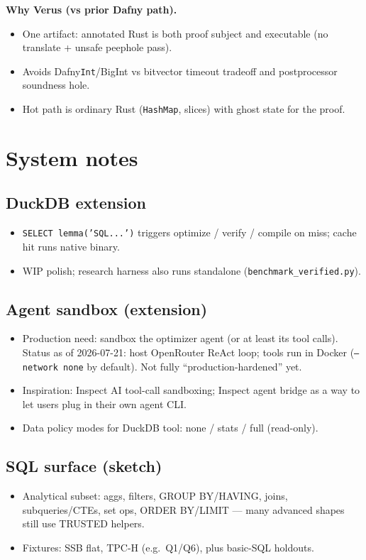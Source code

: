 \documentclass[sigconf, nonacm]{acmart}
\begin{document}
\noindent\textbf{Why Verus (vs prior Dafny path).}
\begin{itemize}
  \item One artifact: annotated Rust is both proof subject and executable (no translate + unsafe peephole pass).
  \item Avoids Dafny\texttt{Int}/BigInt vs bitvector timeout tradeoff and postprocessor soundness hole.
  \item Hot path is ordinary Rust (\texttt{HashMap}, slices) with ghost state for the proof.
\end{itemize}

\section{System notes}

\subsection{DuckDB extension}
\begin{itemize}
  \item \texttt{SELECT lemma('SQL...')} triggers optimize / verify / compile on miss; cache hit runs native binary.
  \item WIP polish; research harness also runs standalone (\texttt{benchmark\_verified.py}).
\end{itemize}

\subsection{Agent sandbox (extension)}
\begin{itemize}
  \item Production need: sandbox the optimizer agent (or at least its tool calls). Status as of 2026-07-21: host OpenRouter ReAct loop; tools run in Docker (\texttt{--network none} by default). Not fully ``production-hardened'' yet.
  \item Inspiration: Inspect AI tool-call sandboxing; Inspect agent bridge as a way to let users plug in their own agent CLI.
  \item Data policy modes for DuckDB tool: none / stats / full (read-only).
\end{itemize}

\subsection{SQL surface (sketch)}
\begin{itemize}
  \item Analytical subset: aggs, filters, GROUP BY/HAVING, joins, subqueries/CTEs, set ops, ORDER BY/LIMIT --- many advanced shapes still use TRUSTED helpers.
  \item Fixtures: SSB flat, TPC-H (e.g.\ Q1/Q6), plus basic-SQL holdouts.
\end{itemize}
\end{document}
